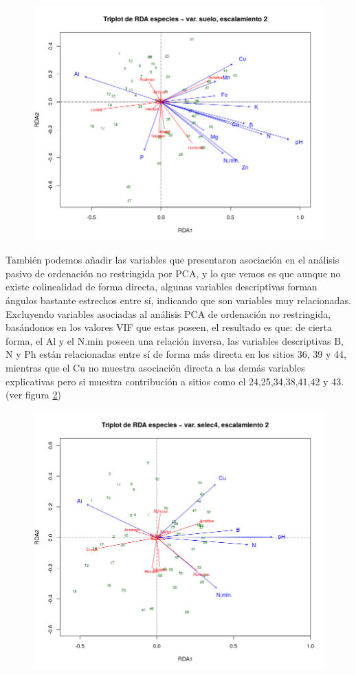 \documentclass[11pt,]{article}
\begin{document}
\begin{figure}
\centering
\includegraphics{RDA.png}
\caption{\label{fig:RDA}}
\end{figure}

También podemos añadir las variables que presentaron asociación en el
análisis pasivo de ordenación no restringida por PCA, y lo que vemos es
que aunque no existe colinealidad de forma directa, algunas variables
descriptivas forman ángulos bastante estrechos entre sí, indicando que
son variables muy relacionadas. Excluyendo variables asociadas al
análisis PCA de ordenación no restringida, basándonos en los valores VIF
que estas poseen, el resultado es que: de cierta forma, el Al y el N.min
poseen una relación inversa, las variables descriptivas B, N y Ph están
relacionadas entre sí de forma más directa en los sitios 36, 39 y 44,
mientras que el Cu no muestra asociación directa a las demás variables
explicativas pero si muestra contribución a sitios como el
24,25,34,38,41,42 y 43. (ver figura \ref{fig:PCA_RDA})

\begin{figure}
\centering
\includegraphics{PCA_RDA.png}
\caption{\label{fig:PCA_RDA}}
\end{figure}
\end{document}
